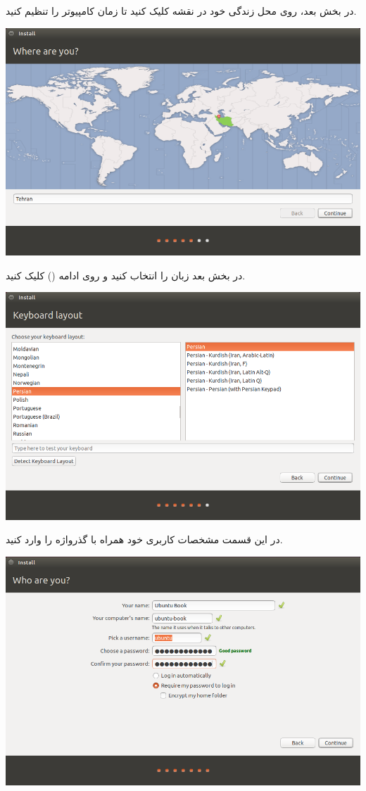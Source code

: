 در بخش بعد، روی محل زندگی خود در نقشه کلیک کنید تا زمان کامپیوتر را تنظیم کنید.\\
\begin{center}
\includegraphics[scale=0.47]{pics/9.png}\\
\end{center}
در بخش بعد زبان  را انتخاب کنید و روی ادامه () کلیک کنید.

\begin{center}
\includegraphics[scale=0.47]{pics/10.png}\\
\end{center}

در این قسمت مشخصات کاربری خود همراه با گذرواژه را وارد کنید.
\begin{center}
\includegraphics[scale=0.47]{pics/11.png}
\end{center}

